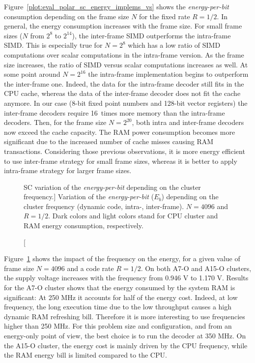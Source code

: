 Figure~\ref{plot:eval_polar_sc_energy_implems_vs} shows the
\emph{energy-per-bit} consumption depending on the frame size $N$ for the fixed
rate $R = 1/2$. In general, the energy consumption increases with the frame
size. For small frame sizes ($N$ from $2^{8}$ to $2^{14}$), the inter-frame SIMD
outperforms the intra-frame SIMD. This is especially true for $N = 2^8$ which
has a low ratio of SIMD computations over scalar computations in the intra-frame
version. As the frame size increases, the ratio of SIMD versus scalar
computations increases as well. At some point around $N = 2^{16}$ the
intra-frame implementation begins to outperform the inter-frame one. Indeed, the
data for the intra-frame decoder still fits in the CPU cache, whereas the data
of the inter-frame decoder does not fit the cache anymore. In our case (8-bit
fixed point numbers and 128-bit vector registers) the inter-frame decoders
require 16~times more memory than the intra-frame decoders. Then, for the frame
size $N = 2^{20}$, both intra and inter-frame decoders now exceed the cache
capacity. The RAM power consumption becomes more significant due to the
increased number of cache misses causing RAM transactions. Considering those
previous observations, it is more energy efficient to use inter-frame strategy
for small frame sizes, whereas it is better to apply intra-frame strategy for
larger frame sizes.

\begin{figure}[htp]
  \centering
  \quad
  \caption
    [SC variation of the \emph{energy-per-bit} depending on the cluster
    frequency.]
    {Variation of the \emph{energy-per-bit} ($E_b$) depending on the cluster
    frequency (dynamic code, intra-, inter-frame). $N = 4096$ and $R = 1/2$.
    Dark colors and light colors stand for CPU cluster and RAM energy
    consumption, respectively.}
  \label{plot:eval_polar_sc_energy_freq}
\end{figure}

Figure~\ref{plot:eval_polar_sc_energy_freq} shows the impact of the frequency on
the energy, for a given value of frame size $N=4096$ and a code rate $R=1/2$. On
both A7-O and A15-O clusters, the supply voltage increases with the frequency
from 0.946 V to 1.170 V. Results for the A7-O \little cluster shows that the
energy consumed by the system RAM is significant: At 250 MHz it accounts for
half of the energy cost. Indeed, at low frequency, the long execution time due
to the low throughput causes a high dynamic RAM refreshing bill. Therefore it is
more interesting to use frequencies higher than 250 MHz. For this problem size
and configuration, and from an energy-only point of view, the best choice is to
run the decoder at 350 MHz. On the A15-O \bigARM cluster, the energy cost is
mainly driven by the CPU frequency, while the RAM energy bill is limited
compared to the CPU.


